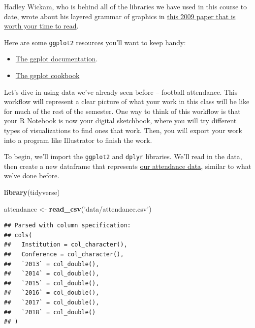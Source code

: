 \documentclass[]{book}
\newenvironment{Shaded}{\begin{snugshade}}{\end{snugshade}}
\newcommand{\KeywordTok}[1]{\textcolor[rgb]{0.13,0.29,0.53}{\textbf{#1}}}
\newcommand{\NormalTok}[1]{#1}
\newcommand{\StringTok}[1]{\textcolor[rgb]{0.31,0.60,0.02}{#1}}
\providecommand{\tightlist}{%
  \setlength{\itemsep}{0pt}\setlength{\parskip}{0pt}}
\begin{document}
Hadley Wickam, who is behind all of the libraries we have used in this course to date, wrote about his layered grammar of graphics in \href{http://byrneslab.net/classes/biol607/readings/wickham_layered-grammar.pdf}{this 2009 paper that is worth your time to read}.

Here are some \texttt{ggplot2} resources you'll want to keep handy:

\begin{itemize}
\tightlist
\item
  \href{http://ggplot2.tidyverse.org/reference/index.html}{The ggplot documentation}.
\item
  \href{http://www.cookbook-r.com/Graphs/}{The ggplot cookbook}
\end{itemize}

Let's dive in using data we've already seen before -- football attendance. This workflow will represent a clear picture of what your work in this class will be like for much of the rest of the semester. One way to think of this workflow is that your R Notebook is now your digital sketchbook, where you will try different types of visualizations to find ones that work. Then, you will export your work into a program like Illustrator to finish the work.

To begin, we'll import the \texttt{ggplot2} and \texttt{dplyr} libraries. We'll read in the data, then create a new dataframe that represents \href{https://unl.box.com/s/etqna5bfvf3b0gsnw0kcjjn1rxx9335s}{our attendance data}, similar to what we've done before.

\begin{Shaded}
\begin{Highlighting}[]
\KeywordTok{library}\NormalTok{(tidyverse)}
\end{Highlighting}
\end{Shaded}

\begin{Shaded}
\begin{Highlighting}[]
\NormalTok{attendance <-}\StringTok{ }\KeywordTok{read_csv}\NormalTok{(}\StringTok{'data/attendance.csv'}\NormalTok{)}
\end{Highlighting}
\end{Shaded}

\begin{verbatim}
## Parsed with column specification:
## cols(
##   Institution = col_character(),
##   Conference = col_character(),
##   `2013` = col_double(),
##   `2014` = col_double(),
##   `2015` = col_double(),
##   `2016` = col_double(),
##   `2017` = col_double(),
##   `2018` = col_double()
## )
\end{verbatim}
\end{document}
